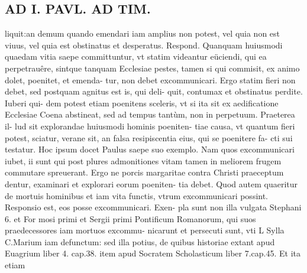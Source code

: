 \documentclass{article}
\begin{document}
\begin{pages}
\section*{AD I. PAVL. AD TIM. }
\marginpar{[ p.390 ]}\pstart liquit:an demum quando emendari iam amplius non potest, vel quia non est viuus, vel quia est obstinatus et desperatus. Respond. Quanquam huiusmodi quaedam vitia saepe committuntur, vt statim videantur eüciendi, qui ea perpetrauêre, sintque tanquam Ecclesiae pestes, tamen si qui commisit, ex animo dolet, poenitet, et emenda- tur, non debet excommunicari. Ergo statim fieri non debet, sed postquam agnitus est is, qui deli- quit, contumax et obstinatus perdite. Iuberi qui- dem potest etiam poenitens sceleris, vt si ita sit ex aedificatione Ecclesiae Coena abstineat, sed ad tempus tantùm, non in perpetuum. Praeterea il- lud sit explorandae huiusmodi hominis poeniten- tiae causa, vt quantum fieri potest, sciatur, verane sit, an falsa resipiscentia eius, qui se poenitere fa- cti sui testatur. Hoc ipsum docet Paulus saepe suo exemplo. Nam quos excommunicari iubet, ii sunt qui post plures admonitiones vitam tamen in meliorem frugem commutare spreuerant. Ergo ne porcis margaritae contra Christi praeceptum dentur, examinari et explorari eorum poeniten- tia debet.  \pend\pstart Quod autem quaeritur de mortuis hominibus et iam vita functis, vtrum excommunicari possint. Responsio est, eos posse excommunicari. Exen- pla sunt non illa vulgata Stephani 6. et For mosi primi et Sergii primi Pontificum Romanorum, qui suos praedecessores iam mortuos excommu- nicarunt et persecuti sunt, vti L Sylla C.Marium iam defunctum: sed illa potius, de quibus historiae extant apud Euagrium liber  4. cap.38. item apud Socratem Scholasticum liber 7.cap.45. Et ita etiam  \pend

\end{pages}
\end{document}
